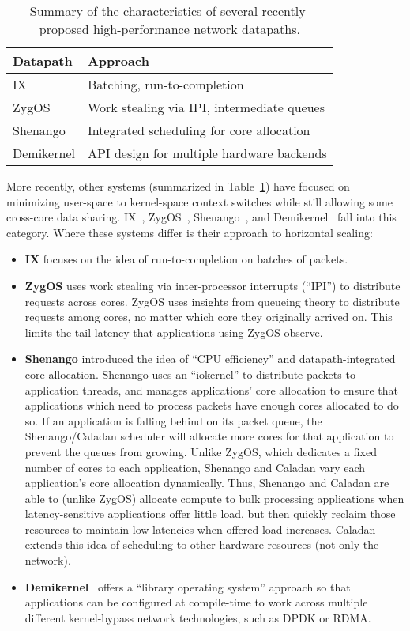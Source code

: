 \begin{table}
    \begin{tabular}{lp{8cm}}
      Datapath      & Approach \\
    \hline
      IX            & Batching, run-to-completion \\
      ZygOS         & Work stealing via IPI, intermediate queues \\
      Shenango      & Integrated scheduling for core allocation \\
      Demikernel    & API design for multiple hardware backends \\
    \end{tabular}
    \caption{Summary of the characteristics of several recently-proposed high-performance network datapaths.} \label{t:systems}
\end{table}
More recently, other systems (summarized in Table~\ref{t:systems}) have focused on minimizing user-space to kernel-space context switches while still allowing some cross-core data sharing. IX~\cite{ix}, ZygOS~\cite{zygos}, Shenango~\cite{shenango}, and Demikernel~\cite{demikernel} fall into this category. Where these systems differ is their approach to horizontal scaling:
\begin{itemize}
    \item \textbf{IX} focuses on the idea of run-to-completion on batches of packets.
    \item \textbf{ZygOS} uses work stealing via inter-processor interrupts (``IPI'') to distribute requests across cores. ZygOS uses insights from queueing theory to distribute requests among cores, no matter which core they originally arrived on. This limits the tail latency that applications using ZygOS observe.
    \item \textbf{Shenango} introduced the idea of ``CPU efficiency'' and datapath-integrated core allocation. Shenango uses an ``iokernel'' to distribute packets to application threads, and manages applications' core allocation to ensure that applications which need to process packets have enough cores allocated to do so.
If an application is falling behind on its packet queue, the Shenango/Caladan scheduler will allocate more cores for that application to prevent the queues from growing.
Unlike ZygOS, which dedicates a fixed number of cores to each application, Shenango and Caladan vary each application's core allocation dynamically.
Thus, Shenango and Caladan are able to (unlike ZygOS) allocate compute to bulk processing applications when latency-sensitive applications offer little load, but then quickly reclaim those resources to maintain low latencies when offered load increases. Caladan~\cite{caladan} extends this idea of scheduling to other hardware resources (not only the network).
\item \textbf{Demikernel}~\cite{demikernel} offers a ``library operating system'' approach so that applications can be configured at compile-time to work across multiple different kernel-bypass network technologies, such as DPDK or RDMA.
\end{itemize}

